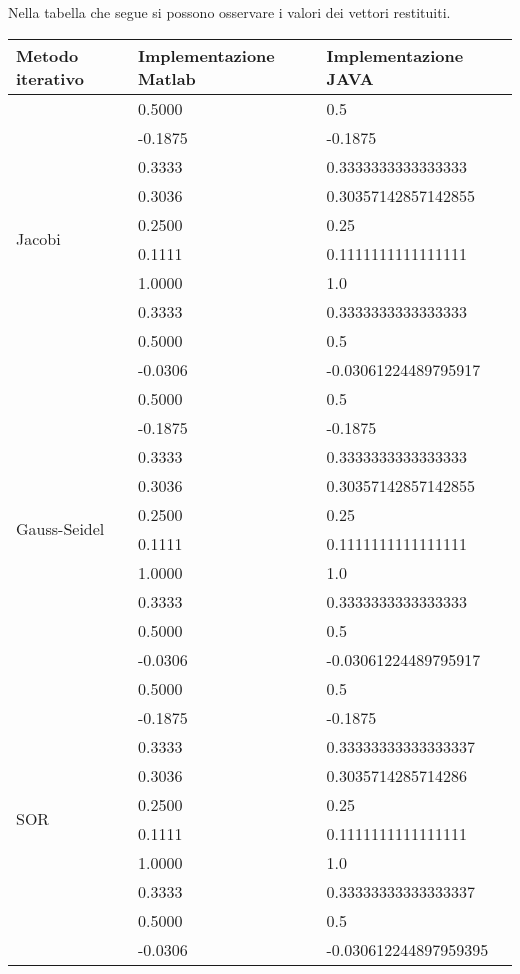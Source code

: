 \documentclass[12pt]{article}
\begin{document}
\newpage
Nella tabella che segue si possono osservare i valori dei vettori restituiti.
\begin{table}[h!]
    \begin{center}
        \label{tab:jacobi}
        \begin{tabular}{p{3cm}|p{4cm}|p{5cm}}
            \toprule
            \textbf{Metodo iterativo} & \textbf{Implementazione Matlab} & \textbf{Implementazione JAVA} \\
            \midrule
            \multirow{10}{*}{Jacobi} & 0.5000 & 0.5\\
            & -0.1875 & -0.1875\\
            & 0.3333 & 0.3333333333333333\\
            & 0.3036 & 0.30357142857142855\\
            & 0.2500 & 0.25\\
            & 0.1111 & 0.1111111111111111\\
            & 1.0000 & 1.0\\
            & 0.3333 & 0.3333333333333333\\
            & 0.5000 & 0.5\\
            & -0.0306 & -0.03061224489795917\\
            \midrule
            \multirow{10}{*}{Gauss-Seidel} & 0.5000 & 0.5\\
            & -0.1875 & -0.1875\\
            & 0.3333 & 0.3333333333333333\\
            & 0.3036 & 0.30357142857142855\\
            & 0.2500 & 0.25\\
            & 0.1111 & 0.1111111111111111\\
            & 1.0000 & 1.0\\
            & 0.3333 & 0.3333333333333333\\
            & 0.5000 & 0.5\\
            & -0.0306 & -0.03061224489795917\\
            \midrule
            \multirow{10}{*}{SOR} & 0.5000 & 0.5\\
            & -0.1875 & -0.1875\\
            & 0.3333 & 0.33333333333333337\\
            & 0.3036 & 0.3035714285714286\\
            & 0.2500 & 0.25\\
            & 0.1111 & 0.1111111111111111\\
            & 1.0000 & 1.0\\
            & 0.3333 & 0.33333333333333337\\
            & 0.5000 & 0.5\\
            & -0.0306 & -0.030612244897959395\\
            \bottomrule
        \end{tabular}
    \end{center}
\end{table}
\newpage
\end{document}
